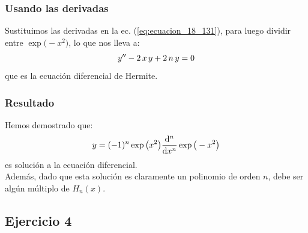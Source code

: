 \documentclass[12pt]{beamer}
\begin{document}
\begin{frame}
\frametitle{Usando las derivadas}
Sustituimos las derivadas en la ec. (\ref{eq:ecuacion_18_131}), para luego dividir entre $\exp\big( - x^{2} \big)$, lo que nos lleva a:
\pause
\begin{align*}
{y}^{\prime \prime} - 2 \, x \, y + 2 \, n \, y = 0
\end{align*}
\pause
que es la ecuación diferencial de Hermite.
\end{frame}
\begin{frame}
\frametitle{Resultado}
Hemos demostrado que:
\pause
\begin{align*}
y = (-1)^{n} \exp\big( x^{2} \big) \dv[n]{x} \exp\big( - x^{2} \big)
\end{align*}
es solución a la ecuación diferencial.
\\
\bigskip
\pause
Además, dado que esta solución es claramente un polinomio de orden $n$, debe ser algún múltiplo de $H_{n} (x)$.
\end{frame}

\subsection{Ejercicio 4}
\end{document}
